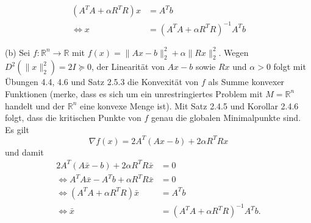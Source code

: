 \documentclass[ngerman, a4paper,12pt]{article}
\begin{document}
\begin{equation*}
	\begin{split}
	(A^TA+\alpha R^TR)x &=A^Tb \\
	\Leftrightarrow x&= (A^TA+\alpha R^TR)^{-1} A^Tb	
	\end{split}
\end{equation*}
\par
(b) Sei $f: \mathbb{R}^n \rightarrow \mathbb{R}$ mit $f(x) = \|Ax-b \|_2^2 + \alpha \|Rx \|_2^2$. Wegen $D^2( \|x \|_2^2)=2I \succeq 0$, der Linearität von $Ax-b$ sowie $Rx$ und $\alpha > 0$ folgt mit Übungen 4.4, 4.6 und Satz 2.5.3 die Konvexität von $f$ als Summe konvexer Funktionen (merke, dass es sich um ein unrestringiertes Problem mit $M=\mathbb{R}^n$ handelt und der $\mathbb{R}^n$ eine konvexe Menge ist). Mit Satz 2.4.5 und Korollar 2.4.6 folgt, dass die kritischen Punkte von $f$ genau die globalen Minimalpunkte sind. Es gilt
\begin{equation}
	\nabla f(x) = 2A^T(Ax-b) + 2\alpha R^TRx
\end{equation}
und damit
\begin{equation*}
	\begin{split}
		2A^T(A\bar{x}-b) + 2\alpha R^TR\bar{x} &= 0 \\
		\Leftrightarrow A^TA\bar{x}-A^Tb+\alpha R^TR\bar{x} &=0 \\
		\Leftrightarrow (A^TA+\alpha R^TR)\bar{x} &=A^Tb \\
		\Leftrightarrow \bar{x} &= (A^TA+\alpha R^TR)^{-1}A^Tb.
	\end{split}
\end{equation*}
\end{document}
